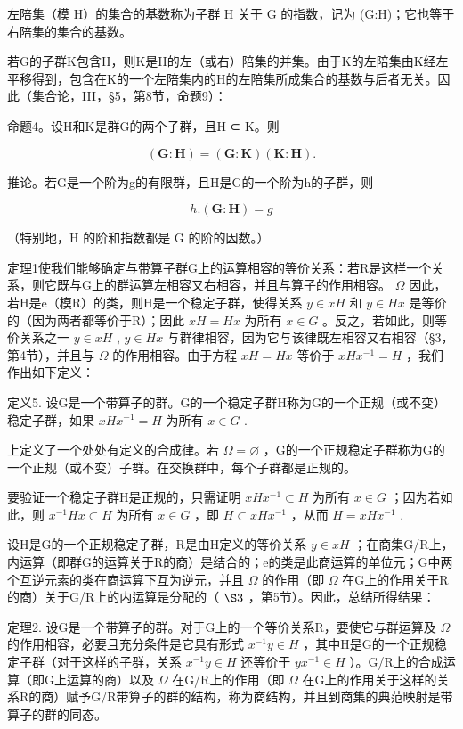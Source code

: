 左陪集（模 H）的集合的基数称为子群 H 关于 G 的指数，记为 (G:H)；它也等于右陪集的集合的基数。

若G的子群K包含H，则K是H的左（或右）陪集的并集。由于K的左陪集由K经左平移得到，包含在K的一个左陪集内的H的左陪集所成集合的基数与后者无关。因此（集合论，III，§5，第8节，命题9）：

命题4。设H和K是群G的两个子群，且H ⊂ K。则

\[
(\mathbf {G}: \mathbf {H}) = (\mathbf {G}: \mathbf {K}) (\mathbf {K}: \mathbf {H}).\tag{2}
\]

推论。若G是一个阶为g的有限群，且H是G的一个阶为h的子群，则

\[
h. (\mathbf {G}: \mathbf {H}) = g\tag{3}
\]

（特别地，H 的阶和指数都是 G 的阶的因数。）

定理1使我们能够确定与带算子群G上的运算相容的等价关系：若R是这样一个关系，则它既与G上的群运算左相容又右相容，并且与算子的作用相容。 \(\Omega\) 因此，若H是e（模R）的类，则H是一个稳定子群，使得关系 \(y \in xH\) 和 \(y \in Hx\) 是等价的（因为两者都等价于R）；因此 \(xH = Hx\) 为所有 \(x \in G\) 。反之，若如此，则等价关系之一 \(y \in xH\) , \(y \in Hx\) 与群律相容，因为它与该律既左相容又右相容（§3，第4节），并且与 \(\Omega\) 的作用相容。由于方程 \(xH = Hx\) 等价于 \(xHx^{-1} = H\) ，我们作出如下定义：

定义5. 设G是一个带算子的群。G的一个稳定子群H称为G的一个正规（或不变）稳定子群，如果 \(xHx^{-1} = H\) 为所有 \(x \in G\) .

上定义了一个处处有定义的合成律。若 \(\Omega = \varnothing\) ，G的一个正规稳定子群称为G的一个正规（或不变）子群。在交换群中，每个子群都是正规的。

要验证一个稳定子群H是正规的，只需证明 \(xHx^{-1} \subset H\) 为所有 \(x \in G\) ；因为若如此，则 \(x^{-1}Hx \subset H\) 为所有 \(x \in G\) ，即 \(H \subset xHx^{-1}\) ，从而 \(H = xHx^{-1}\) .

设H是G的一个正规稳定子群，R是由H定义的等价关系 \(y \in xH\) ；在商集G/R上，内运算（即群G的运算关于R的商）是结合的；e的类是此商运算的单位元；G中两个互逆元素的类在商运算下互为逆元，并且 \(\Omega\) 的作用（即 \(\Omega\) 在G上的作用关于R的商）关于G/R上的内运算是分配的（ \(\S 3\) ，第5节）。因此，总结所得结果：

定理2. 设G是一个带算子的群。对于G上的一个等价关系R，要使它与群运算及 \(\Omega\) 的作用相容，必要且充分条件是它具有形式 \(x^{-1}y \in H\) ，其中H是G的一个正规稳定子群（对于这样的子群，关系 \(x^{-1}y \in H\) 还等价于 \(yx^{-1} \in H\) ）。G/R上的合成运算（即G上运算的商）以及 \(\Omega\) 在G/R上的作用（即 \(\Omega\) 在G上的作用关于这样的关系R的商）赋予G/R带算子的群的结构，称为商结构，并且到商集的典范映射是带算子的群的同态。

